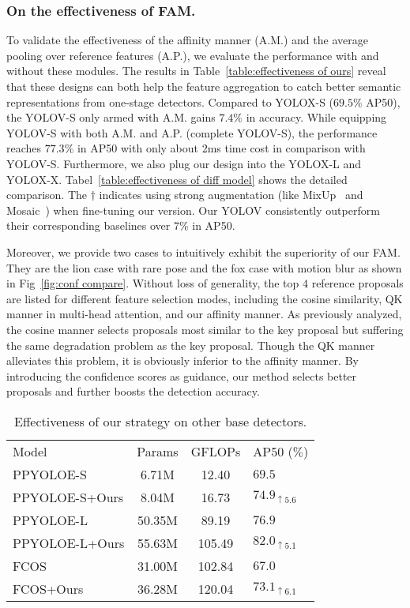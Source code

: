 \documentclass[letterpaper]{article} \usepackage{aaai23}  \usepackage{times}  \usepackage{helvet}  \usepackage{courier}  \usepackage[hyphens]{url}  \usepackage{graphicx} \urlstyle{rm} \def\UrlFont{\rm}  \usepackage{natbib}  \usepackage{caption} \usepackage{xcolor}
\begin{document}
\subsubsection{On the effectiveness of FAM.} To validate the effectiveness of the affinity manner (A.M.) and the average pooling over reference features (A.P.), we evaluate the performance with and without these modules. The results in Table~\ref{table:effectiveness of ours} reveal that these designs can both help the feature aggregation to catch better semantic representations from one-stage detectors. Compared to YOLOX-S ($69.5\%$ AP50), the YOLOV-S only armed with A.M. gains $7.4\%$ in accuracy. While equipping YOLOV-S with both A.M. and A.P. (complete YOLOV-S), the performance reaches $77.3\%$ in AP50 with only about 2ms time cost in comparison with YOLOV-S. Furthermore, we also plug our design into the YOLOX-L and YOLOX-X. Tabel~\ref{table:effectiveness of diff model} shows the detailed comparison. The $\dagger$ indicates using strong augmentation (like MixUp~\cite{zhang2018mixup} and Mosaic~\cite{bochkovskiy2020yolov4}) when fine-tuning our version. Our YOLOV consistently outperform their corresponding baselines over $7\%$ in AP50. 

Moreover, we provide two cases to intuitively exhibit the superiority of our FAM. They are the lion case with rare pose and the fox case with motion blur as shown in Fig~\ref{fig:conf compare}. Without loss of generality, the top $4$ reference proposals are listed for different feature selection modes, including the cosine similarity, QK manner in multi-head attention, and our affinity manner. As previously analyzed, the cosine manner selects proposals most similar to the key proposal but suffering the same degradation problem as the key proposal. Though the QK manner alleviates this problem, it is obviously inferior to the affinity manner. By introducing the confidence scores as guidance, our method selects better proposals and further boosts the detection accuracy. 


\setlength{\tabcolsep}{4pt}
\begin{table}[t]
\begin{center}
\begin{tabular}{l|ccl}
\hline\noalign{\smallskip}
Model&Params&GFLOPs&AP50 ($\%$)\\
\noalign{\smallskip}
\hline
\noalign{\smallskip}
PPYOLOE-S & 6.71M & 12.40 &$69.5$\\
PPYOLOE-S+Ours & 8.04M & 16.73 & $74.9_{\uparrow 5.6}$\\
PPYOLOE-L & 50.35M & 89.19  &  $76.9$\\
PPYOLOE-L+Ours & 55.63M & 105.49 &  $82.0_{\uparrow 5.1}$ \\
FCOS & 31.00M & 102.84& $67.0$\\
FCOS+Ours & 36.28M & 120.04 & $73.1_{\uparrow 6.1 }$\\
\hline
\end{tabular}
\end{center}
\caption{Effectiveness of our strategy on other base detectors.}
\label{table:effectiveness of diff detector}
\end{table}
\setlength{\tabcolsep}{1.4pt}
\end{document}
